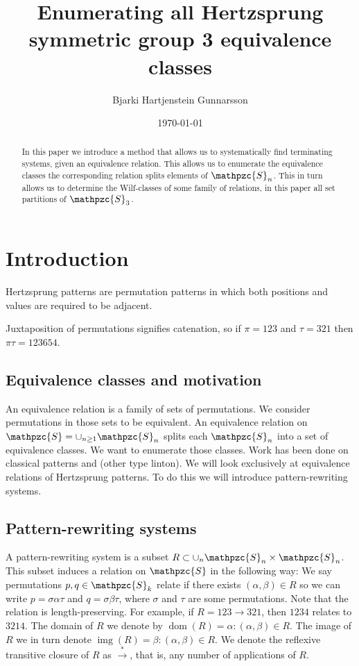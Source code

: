 \documentclass[a4paper, 11pt]{article}
\theoremstyle{definition}
\newcommand{\Sym}{\mathpzc{S}}
\newcommand{\tostar}{\stackrel{*}{\to}}
\DeclareMathOperator{\dom}{dom}
\DeclareMathOperator{\img}{img}
\begin{document}
\title{Enumerating all Hertzsprung symmetric group 3 equivalence classes}
\author{Bjarki Hartjenstein Gunnarsson}
\date{\today}
\maketitle

\begin{abstract}
    In this paper we introduce a method that allows us to systematically find
    terminating systems, given an equivalence relation. This allows us to
    enumerate the equivalence classes the corresponding relation splits
    elements of $\Sym_n$. This in turn allows us to determine the Wilf-classes
    of some family of relations, in this paper all set partitions of $\Sym_3$.
\end{abstract}

\section{Introduction}
Hertzsprung patterns are permutation patterns in which both positions and values are
required to be adjacent.

Juxtaposition of permutations signifies catenation, so if $\pi=123$ and
$\tau=321$ then $\pi\tau=123654$.

\subsection{Equivalence classes and motivation}
An equivalence relation is a family of sets of permutations.  We consider
permutations in those sets to be equivalent.  An equivalence relation on $\Sym =
\cup_{n \geq 1} \Sym_n$ splits each $\Sym_n$ into a set of equivalence classes.
We want to enumerate those classes.  Work has been done on classical patterns
and (other type linton).  We will look exclusively at equivalence relations of
Hertzsprung patterns.  To do this we will introduce pattern-rewriting systems.

\subsection{Pattern-rewriting systems}
A pattern-rewriting system is a subset $R \subset \cup_n \Sym_n \times \Sym_n$. 
This subset induces a relation on $\Sym$ in the following way: We say
permutations $p, q \in \Sym_k$ relate if there exists $(\alpha,\beta) \in R$ so 
we can write $p = \sigma \alpha \tau$ and $q = \sigma \beta \tau$, where
$\sigma$ and $\tau$ are some permutations.
Note that the relation is length-preserving.
For example, if $R = {123 \to 321}$, then $1234$ relates to $3214$.
The domain of $R$ we denote by $\dom(R) = {\alpha : (\alpha, \beta) \in R}$.
The image of $R$ we in turn denote $\img(R) = {\beta : (\alpha, \beta) \in R}$.
We denote the reflexive transitive closure of $R$ as $\tostar$, that
is, any number of applications of $R$.
\end{document}
